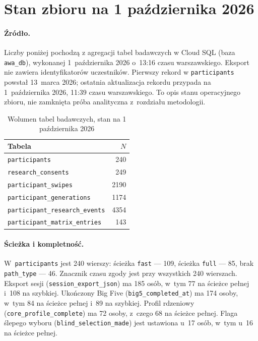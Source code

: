 \section{Stan zbioru na 1 października 2026}
\label{ch08:sec:snapshot-2026-10-01}

\paragraph{Źródło.}
Liczby poniżej pochodzą z agregacji tabel badawczych w Cloud SQL (baza \texttt{awa\_db}), wykonanej 1~października 2026 o~13:16 czasu warszawskiego. Eksport nie zawiera identyfikatorów uczestników. Pierwszy rekord w \texttt{participants} powstał 13~marca 2026; ostatnia aktualizacja rekordu przypada na 1~października 2026, 11:39 czasu warszawskiego. To opis stanu operacyjnego zbioru, nie zamknięta próba analityczna z~rozdziału metodologii.

\begin{table}[ht]
  \centering
  \caption{Wolumen tabel badawczych, stan na 1 października 2026}
  \label{tab:ch08:volume-2026-10-01}
  \begin{tabular}{lr}
    \toprule
    Tabela & $N$ \\
    \midrule
    \texttt{participants} & 240 \\
    \texttt{research\_consents} & 249 \\
    \texttt{participant\_swipes} & 2190 \\
    \texttt{participant\_generations} & 1174 \\
    \texttt{participant\_research\_events} & 4354 \\
    \texttt{participant\_matrix\_entries} & 143 \\
    \bottomrule
  \end{tabular}
\end{table}

\paragraph{Ścieżka i kompletność.}
W~\texttt{participants} jest 240 wierszy: ścieżka \texttt{fast} --- 109, ścieżka \texttt{full} --- 85, brak \texttt{path\_type} --- 46. Znacznik czasu zgody jest przy wszystkich 240 wierszach. Eksport sesji (\texttt{session\_export\_json}) ma 185 osób, w~tym 77 na ścieżce pełnej i~108 na szybkiej. Ukończony Big Five (\texttt{big5\_completed\_at}) ma 174 osoby, w~tym 84 na ścieżce pełnej i~89 na szybkiej. Profil rdzeniowy (\texttt{core\_profile\_complete}) ma 72 osoby, z~czego 68 na ścieżce pełnej. Flaga ślepego wyboru (\texttt{blind\_selection\_made}) jest ustawiona u~17 osób, w~tym u~16 na ścieżce pełnej.

